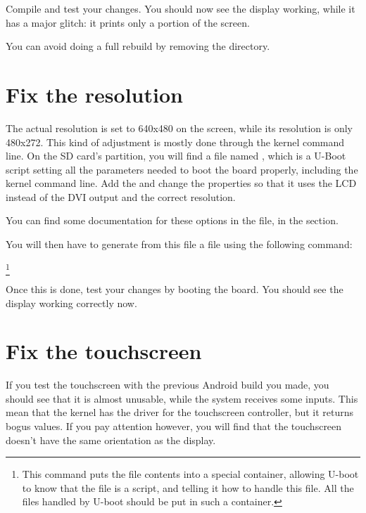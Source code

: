 Compile and test your changes. You should now see the display working,
while it has a major glitch: it prints only a portion of the screen.

You can avoid doing a full rebuild by removing the
 directory.

\section{Fix the resolution}

The actual resolution is set to 640x480 on the screen, while its
resolution is only 480x272. This kind of adjustment is mostly done
through the kernel command line. On the SD card's 
partition, you will find a file named , which is a
U-Boot script setting all the parameters needed to boot the board
properly, including the kernel command line. Add the
 and change the  properties
so that it uses the LCD instead of the DVI output and the correct
resolution.

You can find some documentation for these options in the
 file, in the
 section.

You will then have to generate from this  file a
 file using the following command:

\footnote{This command puts the  file contents into a
  special container, allowing U-boot to know that the 
  file is a script, and telling it how to handle this file. All the
  files handled by U-boot should be put in such a container.}
 
Once this is done, test your changes by booting the board. You should
see the display working correctly now.

\section{Fix the touchscreen}

If you test the touchscreen with the previous Android build you made,
you should see that it is almost unusable, while the system receives
some inputs. This mean that the kernel has the driver for the
touchscreen controller, but it returns bogus values. If you pay
attention however, you will find that the touchscreen doesn't have the
same orientation as the display.

